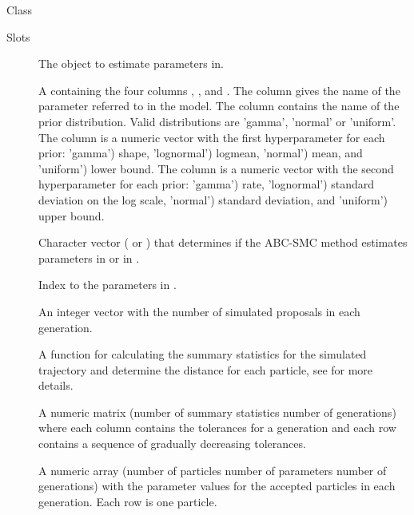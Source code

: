 \documentclass[letterpaper]{book}
\begin{document}
%
\begin{Description}
Class 
\end{Description}
%
\begin{Section}{Slots}

\begin{description}

\item[] The  object to estimate parameters
in.

\item[] A  containing the four columns
, ,  and
. The column  gives the name of the
parameter referred to in the model. The column
 contains the name of the prior
distribution. Valid distributions are 'gamma', 'normal' or
'uniform'. The column  is a numeric vector with the
first hyperparameter for each prior: 'gamma') shape,
'lognormal') logmean, 'normal') mean, and 'uniform') lower
bound. The column  is a numeric vector with the
second hyperparameter for each prior: 'gamma') rate,
'lognormal') standard deviation on the log scale, 'normal')
standard deviation, and 'uniform') upper bound.

\item[] Character vector ( or ) that
determines if the ABC-SMC method estimates parameters in
 or in .

\item[] Index to the parameters in .

\item[] An integer vector with the number of simulated
proposals in each generation.

\item[] A function for calculating the summary statistics for the
simulated trajectory and determine the distance for each
particle, see  for more details.

\item[] A numeric matrix (number of summary statistics
\eqn{\times}{} number of generations) where each column contains
the tolerances for a generation and each row contains a
sequence of gradually decreasing tolerances.

\item[] A numeric array (number of particles \eqn{\times}{} number
of parameters \eqn{\times}{} number of generations) with the
parameter values for the accepted particles in each
generation. Each row is one particle.


\end{description}
\end{Section}
\end{document}

